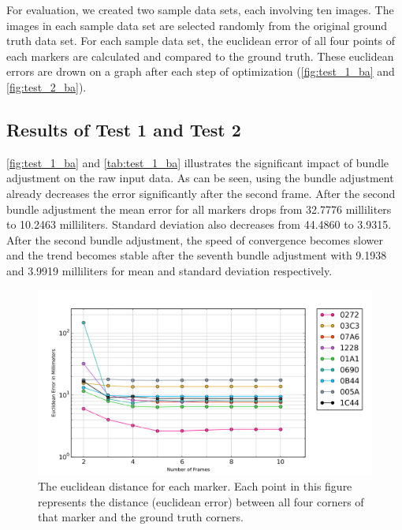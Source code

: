 For evaluation, we created two sample data sets, each involving ten images. The images in each sample data set are selected randomly from the original ground truth data set. For each sample data set, the euclidean error of all four points of each markers are calculated and compared to the ground truth. These euclidean errors are drown on a graph after each step of optimization (\autoref{fig:test_1_ba} and \autoref{fig:test_2_ba}).

\subsection{Results of Test 1 and Test 2} \label{subsec:result_ba}
\autoref{fig:test_1_ba} and \autoref{tab:test_1_ba} illustrates the significant impact of bundle adjustment on the raw input data. As can be seen, using the bundle adjustment already decreases the error significantly after the second frame. After the second bundle adjustment the mean error for all markers drops from 32.7776 milliliters to 10.2463 milliliters. Standard deviation also decreases from 44.4860 to 3.9315. After the second bundle adjustment, the speed of convergence becomes slower and the trend becomes stable after the seventh bundle adjustment with 9.1938 and 3.9919 milliliters for mean and standard deviation respectively.

\begin{figure}[H]
  \centering
  \includegraphics[width=160mm]{figures/graph_test_1}
  \caption{The euclidean distance for each marker. Each point in this figure represents the distance (euclidean error) between all four corners of that marker and the ground truth corners.}\label{fig:test_1_ba}
\end{figure}

